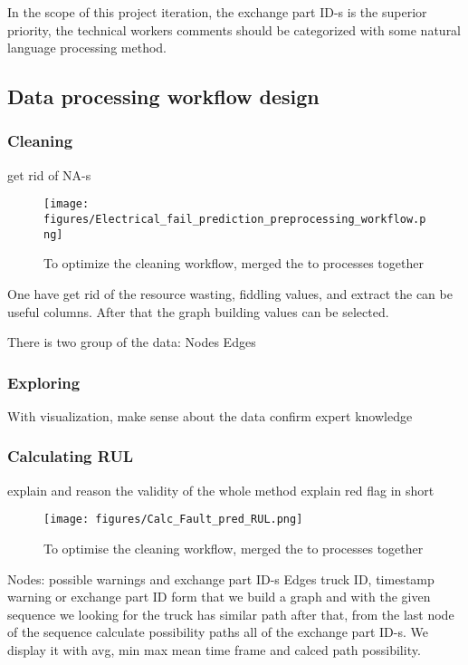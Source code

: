 In the scope of this project iteration, the exchange part ID-s is the superior priority, the technical workers comments should be categorized with some natural language processing method. \cite{nlp}
	\subsection{Data processing workflow design}
\cite{BALNWSCBOOK}
\cite{CSDISTILLED}
\cite{DATACAMP}
\cite{LeanThinking}
		\subsubsection{Cleaning}
		get rid of NA-s
		\begin{figure}[!ht]
		\centering
		\texttt{[image: figures/Electrical\_fail\_prediction\_preprocessing\_workflow.png]}
		\caption{To optimize the cleaning workflow, merged the to processes together} 
		\end{figure}
		One have get rid of the resource wasting, fiddling values, and extract the can be useful columns. After that the graph building values can be selected.

		There is two group of the data:
		Nodes
		Edges

		\subsubsection{Exploring}
		With visualization, make sense about the data 
		confirm expert knowledge
		\subsubsection{Calculating RUL}
explain and reason the validity of the whole method
		explain red flag in short
		\begin{figure}[!ht]
		\centering
		\texttt{[image: figures/Calc\_Fault\_pred\_RUL.png]}
		\caption{To optimise the cleaning workflow, merged the to processes together} 
		\end{figure}
		Nodes: possible warnings and exchange part ID-s
		Edges truck ID, timestamp warning or exchange part ID
		form that we build a graph and with the given sequence we looking for the truck has similar path after that, from the last node of the sequence calculate possibility paths all of the exchange part ID-s. We display it with avg, min max mean time frame and calced path possibility.